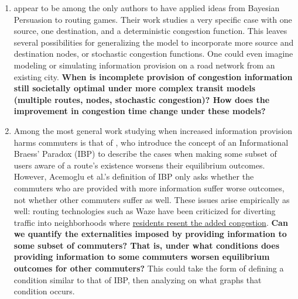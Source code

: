 \documentclass[JEL]{AEA}
\begin{document}
\begin{enumerate}
\item \cite{das-2017} appear to be among the only authors to have applied ideas from Bayesian Persuasion to routing games. Their work studies a very specific case with one source, one destination, and a deterministic congestion function. This leaves several possibilities for generalizing the model to incorporate more source and destination nodes, or stochastic congestion functions. One could even imagine modeling or simulating information provision on a road network from an existing city. \textbf{When is incomplete provision of congestion information still societally optimal under more complex transit models (multiple routes, nodes, stochastic congestion)? How does the improvement in congestion time change under these models?}

\item Among the most general work studying when increased information provision harms commuters is that of \cite{acemoglu-2016}, who introduce the concept of an Informational Braess' Paradox (IBP) to describe the cases when making some subset of users aware of a route's existence worsens their equilibrium outcomes. However, Acemoglu et al.'s definition of IBP only asks whether the commuters who are provided with more information suffer worse outcomes, not whether other commuters suffer as well. These issues arise empirically as well: routing technologies such as Waze have been criticized for diverting traffic into neighborhoods where \href{https://www.washingtonpost.com/local/traffic-weary-homeowners-and-waze-are-at-war-again-guess-whos-winning/2016/06/05/c466df46-299d-11e6-b989-4e5479715b54_story.html}{residents resent the added congestion}. \textbf{Can we quantify the externalities imposed by providing information to some subset of commuters? That is, under what conditions does providing information to some commuters worsen equilibrium outcomes for other commuters?} This could take the form of defining a condition similar to that of IBP, then analyzing on what graphs that condition occurs.

\end{enumerate}






\end{document}
